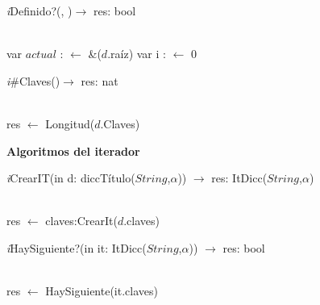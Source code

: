 \begin{Algoritmos}

\textit{i}Definido?(, )$\longrightarrow$ res: bool \\
\hspace*{9mm}\\
\begin{algorithm}[H]
	var $actual$ :  $\leftarrow$ \&($d$.raíz) 
	var i :  $\leftarrow$ $0$ 

\end{algorithm}

\textit{i}$\#$Claves()$\longrightarrow$ res: nat\\
\hspace*{9mm}\\
\begin{algorithm}[H]
	res $\leftarrow$ Longitud($d$.Claves)
\end{algorithm}

\textbf {Algoritmos del iterador}

\textit{i}CrearIT(in d: diccTítulo($String$,$\alpha$)) $\longrightarrow$ res: ItDicc($String$,$\alpha$)\\
\hspace*{9mm}\\
\begin{algorithm}[H]
\BlankLine
res $\leftarrow$ claves:CrearIt($d$.claves)
\end{algorithm}

\textit{i}HaySiguiente?(in it: ItDicc($String$,$\alpha$)) $\longrightarrow$ res: bool\\
\hspace*{9mm}\\
\begin{algorithm}[H]
\BlankLine
res $\leftarrow$ HaySiguiente(it.claves)
\end{algorithm}


\end{Algoritmos}
